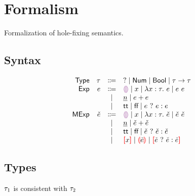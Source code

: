\documentclass{article}
\begin{document}
\renewcommand{\thesection}{\Alph{section}}
\section{Formalism}
Formalization of hole-fixing semantics.

\subsection{Syntax}
\[\begin{array}{rrcl}
  \TMName  & \TMV  & \Coloneqq & \TUnknown \mid \TInt \mid \TBool \mid \TArrow{\TMV}{\TMV} \\
  \EMName  & \EMV  & \Coloneqq & \EEHole \mid x \mid \ELam{x}{\TMV}{\EMV} \mid \EAp{\EMV}{\EMV} \\
           &       & \mid         & \EIntMV \mid \EPlus{\EMV}{\EMV} \\
           &       & \mid         & \ETrue \mid \EFalse \mid \EIf{\EMV}{\EMV}{\EMV} \\
  \ECMName & \ECMV & \Coloneqq & \ECEHole \mid x \mid \ECLam{x}{\TMV}{\ECMV} \mid \ECAp{\ECMV}{\ECMV} \\
           &       & \mid         & \ECIntMV \mid \ECPlus{\ECMV}{\ECMV} \\
           &       & \mid         & \ECTrue \mid \ECFalse \mid \ECIf{\ECMV}{\ECMV}{\ECMV} \\
           &       & \mid         & \ECUnbound{x} \mid \ECInconType{\ECMV} \mid \ECInconBr{\ECMV}{\ECMV}{\ECMV}
\end{array}\]

\subsection{Types}
 $\TMV_1$ is consistent with $\TMV_2$
%
\begin{mathpar}



\end{mathpar} \\
\end{document}
